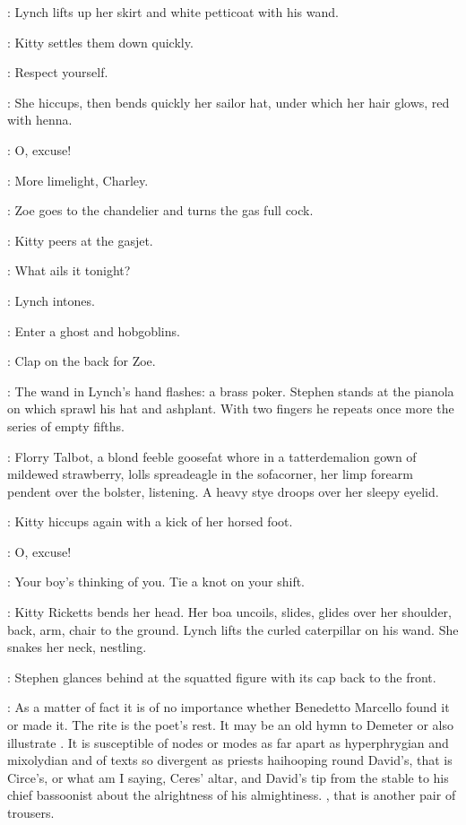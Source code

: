 :
Lynch lifts up her skirt and white petticoat with his wand.

:
Kitty settles them down quickly.

\Kitty:
Respect yourself.

:
She hiccups, then bends quickly her sailor hat,
under which her hair glows, red with henna.

\Kitty:
O, excuse!

\Zoe:
More limelight, Charley.

:
Zoe goes to the chandelier and turns the gas full cock.

:
Kitty peers at the gasjet.

\Kitty:
What ails it tonight?

:
Lynch intones.

\Lynch:
Enter a ghost and hobgoblins.

\Zoe:
Clap on the back for Zoe.

:
The wand in Lynch's hand flashes: a brass poker.
Stephen stands at the pianola on which sprawl his hat and ashplant.
With two fingers he repeats once more the series of empty fifths.

:
Florry Talbot, a blond feeble goosefat whore
in a tatterdemalion gown of mildewed strawberry,
lolls spreadeagle in the sofacorner,
her limp forearm pendent over the bolster, listening.
A heavy stye droops over her sleepy eyelid.

:
Kitty hiccups again with a kick of her horsed foot.

\Kitty:
O, excuse!

\Zoe:
Your boy's thinking of you.
Tie a knot on your shift.

:
Kitty Ricketts bends her head.
Her boa uncoils, slides, glides over her shoulder, back, arm, chair to the ground.
Lynch lifts the curled caterpillar on his wand.
She snakes her neck, nestling.

:
Stephen glances behind at the squatted figure with its cap back to the front.

\Stephen:
As a matter of fact it is of no importance
whether Benedetto Marcello found it or made it.
The rite is the poet's rest.
It may be an old hymn to Demeter
or also illustrate .
It is susceptible of nodes or modes as far apart as hyperphrygian and mixolydian
and of texts so divergent as priests haihooping round David's,
that is Circe's, or what am I saying, Ceres' altar,
and David's tip from the stable to his chief bassoonist
about the alrightness of his almightiness.
, that is another pair of trousers.

